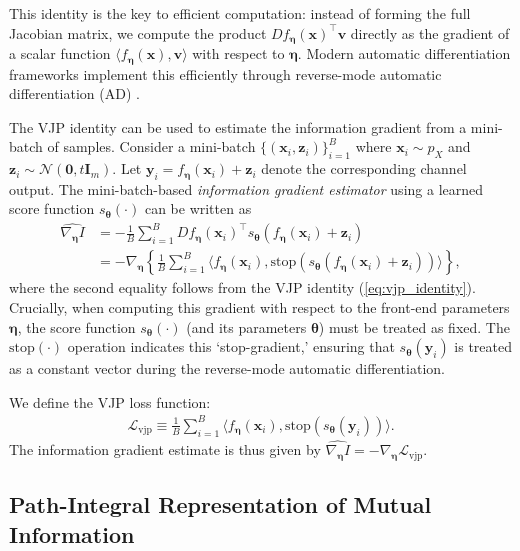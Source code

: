 \documentclass[conference]{IEEEtran}
\newcommand{\bI}{\bm{I}}
\begin{document}
This identity is the key to efficient computation: instead of forming 
the full Jacobian matrix, we compute the product $D f_{\bm \eta}(\bm x)^\top \bm v$ 
directly as the gradient of a scalar function $\langle f_{\bm \eta}(\bm x), \bm v \rangle$ 
with respect to $\bm \eta$. Modern automatic differentiation frameworks implement 
this efficiently through reverse-mode automatic differentiation (AD) \cite{Baydin2018}.

The VJP identity can be used to estimate the information gradient from a mini-batch of samples.
Consider a mini-batch $\{(\bm x_i, \bm z_i)\}_{i=1}^B$ 
where $\bm x_i \sim p_X$ and $\bm z_i \sim \mathcal{N}(\bm{0}, t\bI_m)$.
Let $\bm y_i = f_{\bm \eta}(\bm x_i) + \bm z_i$ denote the corresponding channel output.
The mini-batch-based {\em information gradient estimator} 
using a learned score function $s_{\bm \theta}(\cdot)$ can be written as
\begin{align}
\widehat{\nabla_{\bm \eta} I}
&= -\frac{1}{B}\sum_{i=1}^B D f_{\bm \eta}(\bm x_i)^\top s_{\bm \theta}(f_{\bm \eta}(\bm x_i) + \bm z_i) \nonumber \\
&= -\nabla_{\bm \eta}\left\{\frac{1}{B}\sum_{i=1}^B \langle f_{\bm \eta}(\bm x_i), {\text{stop}(s_{\bm \theta}(f_{\bm \eta}(\bm x_i) + \bm z_i))} \rangle\right\},
\label{eq:batch_vjp}
\end{align}
where the second equality follows from the VJP identity (\ref{eq:vjp_identity}).
Crucially, when computing this gradient with respect to the front-end parameters $\bm \eta$, 
the score function $s_{\bm \theta}(\cdot)$ 
(and its parameters $\bm \theta$) must be treated as fixed.
The $\text{stop}(\cdot)$ operation indicates this `stop-gradient,' 
ensuring that $s_{\bm \theta}(\bm y_i)$ is treated as a constant vector during 
the reverse-mode automatic differentiation.


We define the VJP loss function:
\begin{align}
\mathcal{L}_{\text{vjp}} \equiv \frac{1}{B}\sum_{i=1}^B \langle f_{\bm \eta}(\bm{x}_i), 
\text{stop}(s_{\bm \theta}(\bm{y}_i)) \rangle.
\label{eq:vjp_loss}
\end{align}
The information gradient estimate is thus given by
$
\widehat{\nabla_{\bm \eta} I} = -\nabla_{\bm \eta} \mathcal{L}_{\text{vjp}}.
$

\subsection{Path-Integral Representation of Mutual Information}
\end{document}
